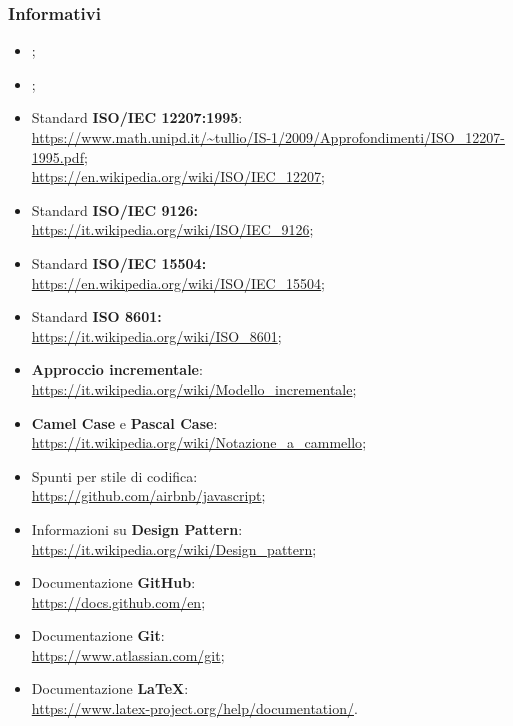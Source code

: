 \subsubsection{Informativi}
\begin{itemize}
\item {};
\item {};
\item Standard \textbf{ISO/IEC 12207:1995}:\\ \url{https://www.math.unipd.it/~tullio/IS-1/2009/Approfondimenti/ISO_12207-1995.pdf};\\
\url{https://en.wikipedia.org/wiki/ISO/IEC_12207};
\item Standard \textbf{ISO/IEC 9126: }\\ \url{https://it.wikipedia.org/wiki/ISO/IEC_9126};
\item Standard \textbf{ISO/IEC 15504: }\\ \url{https://en.wikipedia.org/wiki/ISO/IEC_15504};
\item Standard \textbf{ISO 8601: }\\ \url{https://it.wikipedia.org/wiki/ISO_8601};
\item \textbf{Approccio incrementale}:\\ \url{https://it.wikipedia.org/wiki/Modello_incrementale};
\item \textbf{Camel Case} e \textbf{Pascal Case}:\\ \url{https://it.wikipedia.org/wiki/Notazione_a_cammello};
\item Spunti per stile di codifica:\\ \url{https://github.com/airbnb/javascript};
\item Informazioni su \textbf{Design Pattern}:\\ \url{https://it.wikipedia.org/wiki/Design_pattern};
\item Documentazione \textbf{GitHub}:\\ \url{https://docs.github.com/en};
\item Documentazione \textbf{Git}:\\ \url{https://www.atlassian.com/git};
\item Documentazione \textbf{\LaTeX}:\\ \url{https://www.latex-project.org/help/documentation/}.
\end{itemize}
